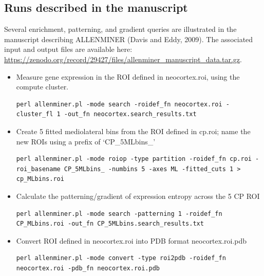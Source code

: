 \documentclass[10pt]{article}
\begin{document}
\subsection{Runs described in the manuscript}

Several enrichment, patterning, and gradient queries are illustrated in the manuscript describing ALLENMINER (Davis and Eddy, 2009). The associated input and output files are available here:\\\href{https://zenodo.org/record/29427/files/allenminer_manuscript_data.tar.gz}{https://zenodo.org/record/29427/files/allenminer\_manuscript\_data.tar.gz}.

\begin{itemize}
\item Measure gene expression in the ROI defined in neocortex.roi, using the compute cluster.

\begin{lstlisting}
perl allenminer.pl -mode search -roidef_fn neocortex.roi -cluster_fl 1 -out_fn neocortex.search_results.txt
\end{lstlisting}

\item Create 5 fitted mediolateral bins from the ROI defined in cp.roi; name the new ROIs using a prefix of `CP\_5MLbins\_'

\begin{lstlisting}
perl allenminer.pl -mode roiop -type partition -roidef_fn cp.roi -roi_basename CP_5MLbins_ -numbins 5 -axes ML -fitted_cuts 1 > cp_MLbins.roi
\end{lstlisting}

\item Calculate the patterning/gradient of expression entropy across the 5 CP ROI

\begin{lstlisting}
perl allenminer.pl -mode search -patterning 1 -roidef_fn CP_MLbins.roi -out_fn CP_5MLbins.search_results.txt
\end{lstlisting}

\item Convert ROI defined in neocortex.roi into PDB format neocortex.roi.pdb

\begin{lstlisting}
perl allenminer.pl -mode convert -type roi2pdb -roidef_fn neocortex.roi -pdb_fn neocortex.roi.pdb
\end{lstlisting}

\end{itemize}
\end{document}
